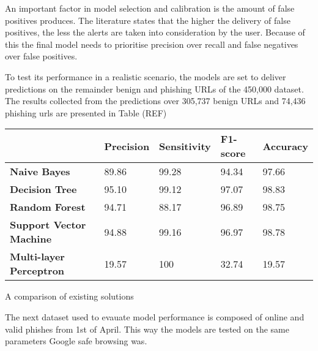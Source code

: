 An important factor in model selection and calibration is the amount of false positives produces. The literature states that the higher the delivery of false positives, the less the alerts are taken into consideration by the user. Because of this the final model needs to prioritise precision over recall and false negatives over false positives.

To test its performance in a realistic scenario, the models are set to deliver predictions on the remainder benign and phishing URLs of the 450,000 dataset. The results collected from the predictions over 305,737 benign URLs and 74,436 phishing urls are presented in Table (REF)


\begin{singlespace}
	\small
	\begin{center}
		\label{tab:FIRST_TRAINED_MODELS}
		\begin{tabular}{ | m{8em} | m{13em} | m{8.5em} | m{2.3em} | m{5em} | }
			\hline
			                                & \textbf{Precision} &\textbf{Sensitivity} &\textbf{F1-score}& \textbf{Accuracy}  \\
			\hline
			\textbf{Naive Bayes}            & 89.86  & 99.28 & 94.34 &97.66        \\
			\hline
			\textbf{Decision Tree}          & 95.10 & 99.12 & 97.07 & 98.83        \\
			\hline
			\textbf{Random Forest}          & 94.71 & 88.17 & 96.89 & 98.75      \\
			\hline
			\textbf{Support Vector Machine} & 94.88 &99.16&96.97&98.78 \\
			\hline
			\textbf{Multi-layer Perceptron} & 19.57 & 100 & 32.74 & 19.57   \\
			\hline
		\end{tabular}
		\captionsetup{type=table}\caption{A comparison of existing solutions \citep{INTELLIGENT_PHISHING_ANFIS}}
	\end{center}
\end{singlespace}


The next dataset used to evauate model performance is composed of online and valid phishes from 1st of April. This way the models are tested on the same parameters Google safe browsing was.

